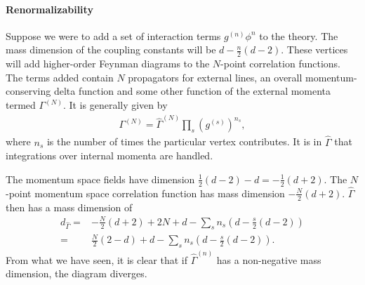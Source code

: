 \paragraph{Renormalizability}
Suppose we were to add a set of interaction terms $g^{(n)}\phi^{n}$ to the theory. The mass dimension of the coupling constants will be $d - \frac{n}{2}(d - 2)$. These vertices will add higher-order Feynman diagrams to the $N$-point correlation functions. The terms added contain $N$ propagators for external lines, an overall momentum-conserving delta function and some other function of the external momenta termed $\Gamma^{(N)}$. It is generally given by
\begin{align*}
	\Gamma^{(N)} = \hat{\Gamma}^{(N)}\prod\limits_{s}(g^{(s)})^{n_{s}},
\end{align*}
where $n_{s}$ is the number of times the particular vertex contributes. It is in $\hat{\Gamma}$ that integrations over internal momenta are handled.

The momentum space fields have dimension $\frac{1}{2}(d - 2) - d = -\frac{1}{2}(d + 2)$. The $N$-point momentum space correlation function has mass dimension $-\frac{N}{2}(d + 2)$. $\hat{\Gamma}$ then has a mass dimension of
\begin{align*}
	d_{\hat{\Gamma}} =& -\frac{N}{2}(d + 2) + 2N + d - \sum\limits_{s}n_{s}\left(d - \frac{s}{2}(d - 2)\right) \\
	                 =& \frac{N}{2}(2 - d) + d - \sum\limits_{s}n_{s}\left(d - \frac{s}{2}(d - 2)\right).
\end{align*}
From what we have seen, it is clear that if $\hat{\Gamma}^{(n)}$ has a non-negative mass dimension, the diagram diverges.